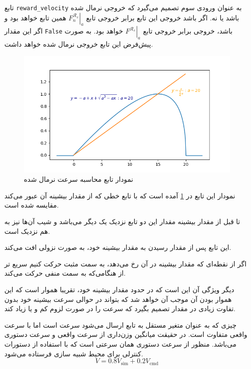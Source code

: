 تابع \texttt{reward\_velocity}
به عنوان ورودی سوم تصمیم می‌گیرد که خروجی نرمال شده باشد یا نه. اگر  باشد خروجی این تابع برابر خروجی تابع 
$\left.F_{n}^{\mathcal{R}_v}\right|_a$
همین تابع خواهد بود و اگر این مقدار \texttt{False} باشد، خروجی برابر خروجی تابع 
$\left.F^{\mathcal{R}_v}\right|_a$
خواهد بود. به صورت پیش‌فرض این تابع خروجی نرمال شده خواهد داشت.


\begin{figure}
	\centering
	\includegraphics[width=0.7\linewidth]{Figures/code/reward-velocity}
	\caption{نمودار تابع محاسبه  سرعت نرمال شده}
	\label{fig:reward-velocity}
\end{figure}


نمودار این تابع در \ref{fig:reward-velocity} آمده است که با تابع خطی که از مقدار بیشینه آن عبور می‌کند مقایسه شده است.

\begin{alphabetlist}
	\item 
	تا قبل از مقدار بیشینه مقدار این دو تابع نزدیک یک دیگر می‌باشد و شیب آن‌ها نیز به هم نزدیک است. 
	\item 
	این تابع پس از مقدار رسیدن به مقدار بیشینه خود، به صورت نزولی افت می‌کند.
	\item
	اگر از نقطه‌ای که مقدار بیشینه در آن رخ می‌دهد، به سمت مثبت حرکت کنیم سریع تر از هنگامی‌که به سمت منفی حرکت می‌کند.
	\item 
	دیگر ویژگی آن این است که در حدود مقدار بیشینه خود، تقریبا هموار است که این هموار بودن آن موجب آن خواهد شد که  بتواند در حوالی سرعت بیشینه خود بدون تفاوت زیادی در مقدار  تصمیم بگیرد که سرعت را در صورت لزوم کم و یا زیاد کند.
\end{alphabetlist}


\begin{remark}
چیزی که به عنوان متغیر مستقل به تابع ارسال می‌شود سرعت است اما با سرعت واقعی متفاوت است. در حقیقت میانگین وزن‌داری از سرعت واقعی و سرعت دستوری می‌باشد. منظور از سرعت دستوری همان سرعتی است که با استفاده از دستورات کنترلی برای محیط شبیه سازی فرستاده می‌شود.
\[
V = 0.8 V_{\mathrm{sim}} + 0.2 V_{\mathrm{cmd}}
\]
\end{remark}

